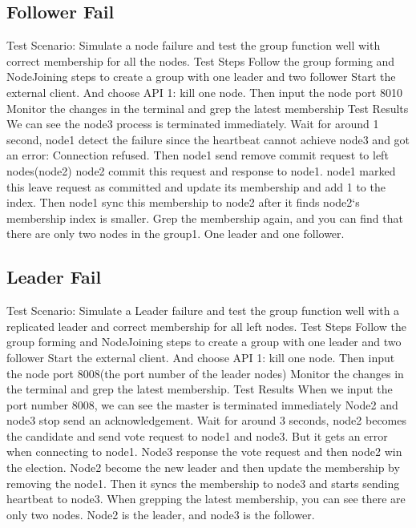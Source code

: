 \documentclass[a4paper,11pt]{article}
\begin{document}
\subsection{Follower Fail}
\begin{outline}
\1 Test Scenario: Simulate a node failure and test the group function well with correct membership for all the nodes.
\1 Test Steps
  \2 Follow the group forming and NodeJoining steps to create a group with one leader and two follower
  \2 Start the external client. And choose API 1: kill one node. Then input the node port 8010
  \2 Monitor the changes in the terminal and grep the latest membership
\1 Test Results
  \2 We can see the node3 process is terminated immediately. Wait for around 1 second, node1 detect the failure since the heartbeat cannot achieve node3 and got an error: Connection refused. Then node1 send remove commit request to left nodes(node2)
  \2 node2 commit this request and response to node1.
  \2 node1 marked this leave request as committed and update its membership and add 1 to the index. Then node1 sync this membership to node2 after it finds node2‘s membership index is smaller.
  \2 Grep the membership again, and you can find that there are only two nodes in the group1. One leader and one follower.
\end{outline}

\subsection{Leader Fail}
\begin{outline}
\1 Test Scenario: Simulate a Leader failure and test the group function well with a replicated leader and correct membership for all left nodes.
\1 Test Steps
  \2 Follow the group forming and NodeJoining steps to create a group with one leader and two follower
  \2 Start the external client. And choose API 1: kill one node. Then input the node port 8008(the port number of the leader nodes)
  \2 Monitor the changes in the terminal and grep the latest membership.
\1 Test Results
  \2 When we input the port number 8008, we can see the master is terminated immediately
  \2 Node2 and node3 stop send an acknowledgement. Wait for around 3 seconds, node2 becomes the candidate and send vote request to node1 and node3. But it gets an error when connecting to node1.
  \2 Node3 response the vote request and then node2 win the election.
  \2 Node2 become the new leader and then update the membership by removing the node1. Then it syncs the membership to node3 and starts sending heartbeat to node3.
  \2 When grepping the latest membership, you can see there are only two nodes. Node2 is the leader, and node3 is the follower.
\end{outline}
\end{document}
